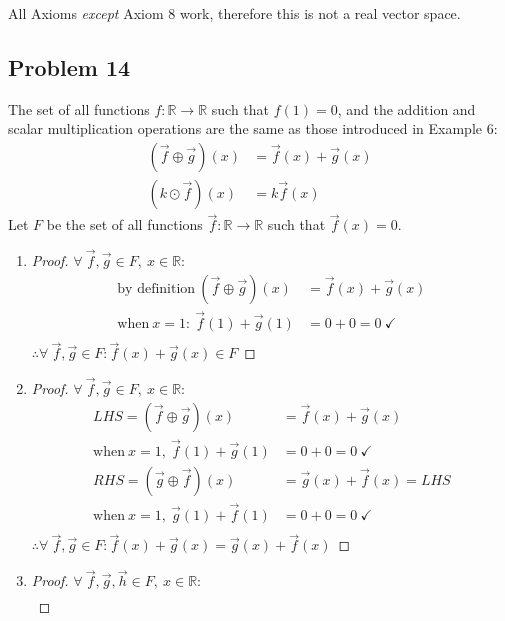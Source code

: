 \documentclass{article}
\newcommand{\bld}{\textbf}
\newcommand{\itl}{\textit}
\newcommand{\bb}{\mathbb}
\newcommand{\bitem}[1]{\item[\bld{#1.}]}
\begin{document}
All Axioms \itl{except} Axiom 8 work, therefore this is not a real vector space.

\subsection*{Problem 14} The set of all functions $f: \bb{R} \rightarrow \bb{R}$ such that $f(1)=0$,
and the addition and scalar multiplication operations are the same as those introduced in Example 6:
\begin{align*}
  (\vec{f} \oplus \vec{g})(x) & = \vec{f}(x) + \vec{g}(x) \\
  (k \odot \vec{f})(x)        & = k\vec{f}(x)
\end{align*}
Let $F$ be the set of all functions $\vec{f}: \bb{R}  \rightarrow \bb{R}$ such that $\vec{f}(x) = 0$.
\begin{enumerate}
  \bitem{Axiom 1}
  \begin{proof}
    $\forall~\vec{f},\vec{g} \in F,~x \in \bb{R}$:
    \begin{align*}
      \text{by definition}~(\vec{f} \oplus \vec{g})(x) & = \vec{f}(x) + \vec{g}(x) \\
      \text{when}~x=1:~\vec{f}(1) + \vec{g}(1)         & = 0 + 0 = 0~\checkmark    \\
    \end{align*}
    $\therefore \forall~\vec{f},\vec{g} \in F: \vec{f}(x) + \vec{g}(x) \in F$
  \end{proof}
  \bitem{Axiom 2}
  \begin{proof}
    $\forall~\vec{f},\vec{g} \in F,~x \in \bb{R}$:
    \begin{align*}
      LHS = (\vec{f} \oplus \vec{g})(x)        & = \vec{f}(x) + \vec{g}(x)       \\
      \text{when}~x=1,~\vec{f}(1) + \vec{g}(1) & = 0 + 0 = 0~\checkmark          \\
      RHS = (\vec{g} \oplus \vec{f})(x)        & = \vec{g}(x) + \vec{f}(x) = LHS \\
      \text{when}~x=1,~\vec{g}(1) + \vec{f}(1) & = 0 + 0 = 0~\checkmark          \\
    \end{align*}
    $\therefore \forall~\vec{f},\vec{g} \in F: \vec{f}(x) + \vec{g}(x) = \vec{g}(x) + \vec{f}(x)$
  \end{proof}
  \bitem{Axiom 3}
  \begin{proof}
    $\forall~\vec{f},\vec{g},\vec{h} \in F,~x \in \bb{R}$:
    \begin{align*}

\end{align*}
\end{proof}
\end{enumerate}
\end{document}
